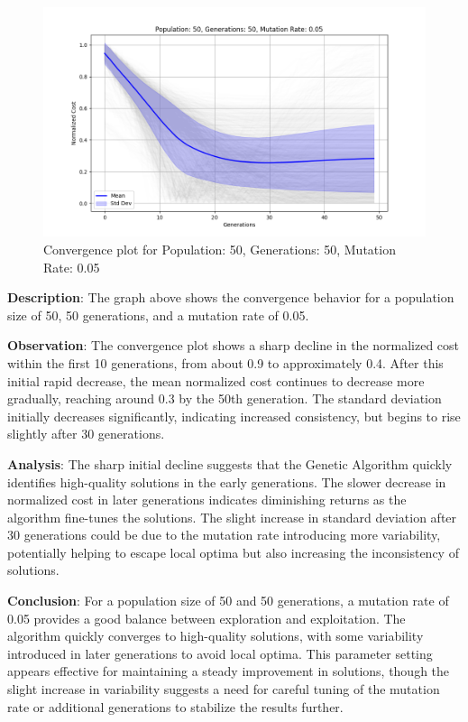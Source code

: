 \documentclass{article}
\begin{document}
    \begin{figure}[H]
        \centering
        \includegraphics[width=\textwidth]{genetic_algorithm/Population_50_Generations_50_MutationRate_0.05}
        \caption{Convergence plot for Population: 50, Generations: 50, Mutation Rate: 0.05}
        \label{fig:ga_50_50_05}
    \end{figure}

    \textbf{Description}: The graph above shows the convergence behavior for a population size of 50, 50 generations, and a mutation rate of 0.05.

    \textbf{Observation}: The convergence plot shows a sharp decline in the normalized cost within the first 10 generations, from about 0.9 to approximately 0.4. After this initial rapid decrease, the mean normalized cost continues to decrease more gradually, reaching around 0.3 by the 50th generation. The standard deviation initially decreases significantly, indicating increased consistency, but begins to rise slightly after 30 generations.

    \textbf{Analysis}: The sharp initial decline suggests that the Genetic Algorithm quickly identifies high-quality solutions in the early generations. The slower decrease in normalized cost in later generations indicates diminishing returns as the algorithm fine-tunes the solutions. The slight increase in standard deviation after 30 generations could be due to the mutation rate introducing more variability, potentially helping to escape local optima but also increasing the inconsistency of solutions.

    \textbf{Conclusion}: For a population size of 50 and 50 generations, a mutation rate of 0.05 provides a good balance between exploration and exploitation. The algorithm quickly converges to high-quality solutions, with some variability introduced in later generations to avoid local optima. This parameter setting appears effective for maintaining a steady improvement in solutions, though the slight increase in variability suggests a need for careful tuning of the mutation rate or additional generations to stabilize the results further.
\end{document}
